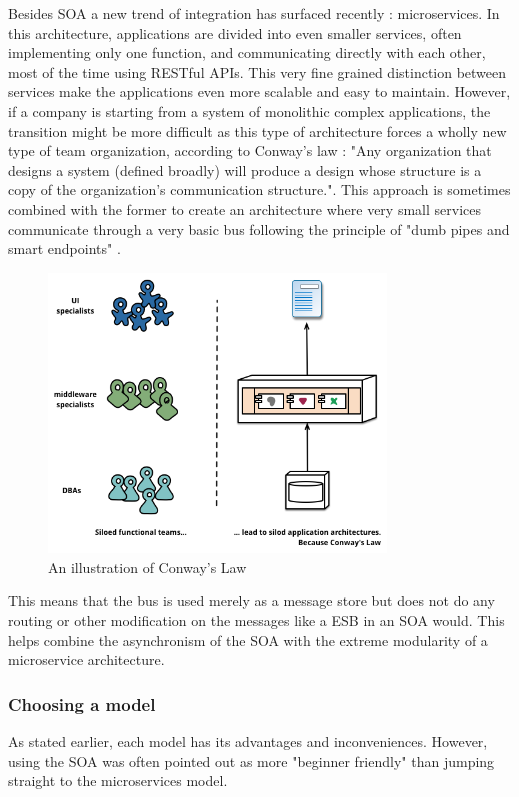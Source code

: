 \documentclass[12pt,a4paper,twoside]{article}
\begin{document}
Besides SOA a new trend of integration has surfaced recently : microservices. In this architecture, applications are divided into even smaller services, often implementing only one function, and communicating directly with each other, most of the time using RESTful APIs. This very fine grained distinction between services make the applications even more scalable and easy to maintain. However, if a company is starting from a system of monolithic complex applications, the transition might be more difficult as this type of architecture forces a wholly new type of team organization, according to Conway's law : "Any organization that designs a system (defined broadly) will produce a design whose structure is a copy of the organization's communication structure.".
This approach is sometimes combined with the former to create an architecture where very small services communicate through a very basic bus following the principle of "dumb pipes and smart endpoints" .\\
\begin{figure}[H]
\centering
\includegraphics[width=0.8\textwidth]{conways-law.png}
\caption{\label{conway's law}An illustration of Conway's Law}
\end{figure}

This means that the bus is used merely as a message store but does not do any routing or other modification on the messages like a ESB in an SOA would. This helps combine the asynchronism of the SOA with the extreme modularity of a microservice architecture.\\

\subsubsection{Choosing a model}
As stated earlier, each model has its advantages and inconveniences. However, using the SOA was often pointed out as more "beginner friendly" than jumping straight to the microservices model.
\end{document}
